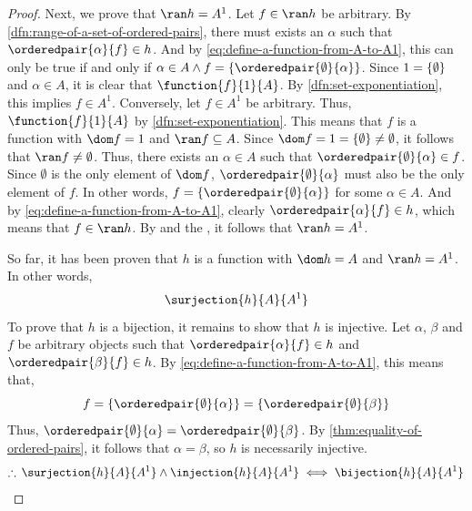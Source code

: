 \begin{proof}
    \vspace{0.2cm}
    \noindent
    Next, we prove that \( \ran h = A^{1} \). Let \( f \in \ran h \) be arbitrary. By \cref{dfn:range-of-a-set-of-ordered-pairs},
    there must exists an \( \alpha \) such that \( \orderedpair{\alpha}{f} \in h \). And by \eqref{eq:define-a-function-from-A-to-A1},
    this can only be true if and only if \( \alpha \in A \land f = \mleft\{ \orderedpair{\emptyset}{\alpha} \mright\} \).
    Since \( 1 = \mleft\{ \emptyset \mright\} \) and \( \alpha \in A \), it is clear that \( \function{f}{1}{A} \).
    By \cref{dfn:set-exponentiation}, this implies \( f \in A^{1} \).
    Conversely, let \( f \in A^{1} \) be arbitrary. Thus, \( \function{f}{1}{A} \) by \cref{dfn:set-exponentiation}.
    This means that \( f \) is a function with \( \dom f = 1 \) and \( \ran f \subseteq A \).
    Since \( \dom f = 1 = \mleft\{ \emptyset \mright\} \neq \emptyset \), it follows that \( \ran f \neq \emptyset \).
    Thus, there exists an \( \alpha \in A \) such that \( \orderedpair{\emptyset}{\alpha} \in f \).
    Since \( \emptyset \) is the only element of \( \dom f \), \( \orderedpair{\emptyset}{\alpha} \) must also be
    the only element of \( f \). In other words, \( f = \mleft\{ \orderedpair{\emptyset}{\alpha} \mright\} \) for some
    \( \alpha \in A \). And by \eqref{eq:define-a-function-from-A-to-A1}, clearly \( \orderedpair{\alpha}{f} \in h \),
    which means that \( f \in \ran h \). By  and the ,
    it follows that \( \ran h = A^{1} \).

    \vspace{0.2cm}
    \noindent
    So far, it has been proven that \( h \) is a function with \( \dom h = A \) and \( \ran h = A^{1} \). In other words,
    \begin{equation*}
        \surjection{h}{A}{A^{1}}
    \end{equation*}
    To prove that \( h \) is a bijection, it remains to show that \( h \) is injective. Let \( \alpha \), \( \beta \) and \( f \)
    be arbitrary objects such that \( \orderedpair{\alpha}{f} \in h \) and \( \orderedpair{\beta}{f} \in h \).
    By \eqref{eq:define-a-function-from-A-to-A1}, this means that,
    \begin{equation*}
        f = \mleft\{ \orderedpair{\emptyset}{\alpha} \mright\} = \mleft\{ \orderedpair{\emptyset}{\beta} \mright\}
    \end{equation*}
    Thus, \( \orderedpair{\emptyset}{\alpha} = \orderedpair{\emptyset}{\beta} \). By \cref{thm:equality-of-ordered-pairs},
    it follows that \( \alpha = \beta \), so \( h \) is necessarily injective.
    \begin{equation*}
        \therefore \, \surjection{h}{A}{A^{1}} \land \injection{h}{A}{A^{1}} \iff \bijection{h}{A}{A^{1}} \qedhere
    \end{equation*}
\end{proof}

